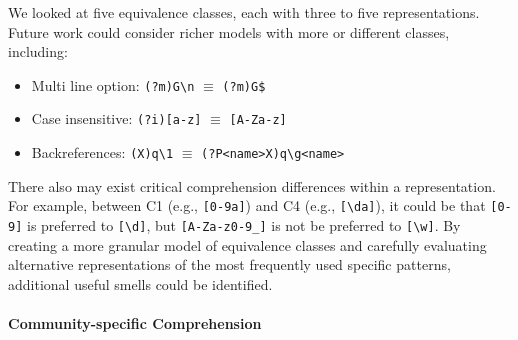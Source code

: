 We looked at five equivalence classes, each with three to five representations. 
Future work could consider richer models with more or different classes, including: 
%
\begin{itemize} %
\item Multi line option: { \verb!(?m)G\n! $\equiv$ \verb!(?m)G$!}
\item Case insensitive:{ \verb!(?i)[a-z]! $\equiv$ \verb![A-Za-z]!}
\item Backreferences: {\verb!(X)q\1! $\equiv$ \verb!(?P<name>X)q\g<name>!}
\end{itemize}



There also may exist critical comprehension differences within a representation. For example, between C1 (e.g., \verb![0-9a]!) and C4 (e.g., \verb![\da]!), it could be that \verb![0-9]! is preferred to \verb![\d]!, but \verb![A-Za-z0-9_]! is not be preferred to \verb![\w]!.
By creating a more granular model of equivalence classes  and carefully evaluating alternative representations of the most frequently used specific patterns,  additional useful smells could be identified.



\paragraph{Community-specific Comprehension}

